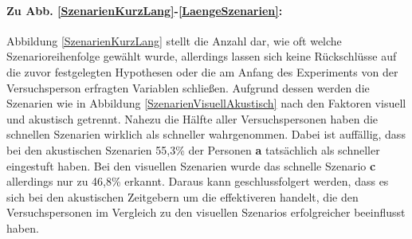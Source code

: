 \documentclass{Paper}
\begin{document}
\paragraph{Zu Abb. \ref{SzenarienKurzLang}-\ref{LaengeSzenarien}:} Abbildung \ref{SzenarienKurzLang} stellt die Anzahl dar, wie oft welche Szenarioreihenfolge gewählt wurde, allerdings lassen sich keine Rückschlüsse auf die zuvor festgelegten Hypothesen oder die am Anfang des Experiments von der Versuchsperson erfragten Variablen schließen. Aufgrund dessen werden die Szenarien wie in Abbildung \ref{SzenarienVisuellAkustisch}
nach den Faktoren visuell und akustisch getrennt. Nahezu die Hälfte aller Versuchspersonen haben die schnellen Szenarien wirklich als schneller wahrgenommen. Dabei ist auffällig, dass bei den akustischen Szenarien 55,3\% der Personen \textbf{a} tatsächlich als schneller eingestuft haben. Bei den visuellen Szenarien wurde das schnelle Szenario \textbf{c} allerdings nur zu 46,8\% erkannt. Daraus kann geschlussfolgert werden, dass es sich bei den akustischen Zeitgebern um die effektiveren handelt, die den Versuchspersonen im Vergleich zu den visuellen Szenarios erfolgreicher beeinflusst haben.
\end{document}
